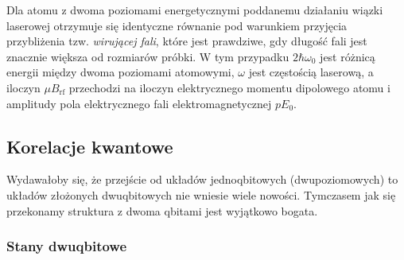 \documentclass{myclass}
\begin{document}
Dla atomu z dwoma poziomami energetycznymi poddanemu działaniu wiązki laserowej otrzymuje się
identyczne równanie pod warunkiem przyjęcia przybliżenia tzw. \textit{wirującej fali}, które jest
prawdziwe, gdy długość fali jest znacznie większa od rozmiarów próbki. W tym przypadku
\(2\hbar\omega_0\) jest różnicą energii między dwoma poziomami atomowymi, \(\omega\) jest częstością
laserową, a iloczyn \(\mu B_\text{rf}\) przechodzi na iloczyn elektrycznego momentu dipolowego atomu
i amplitudy pola elektrycznego fali elektromagnetycznej \(p E_0\).

\subsection{Korelacje kwantowe}

Wydawałoby się, że przejście od układów jednoqbitowych (dwupoziomowych) to układów złożonych
dwuqbitowych nie wniesie wiele nowości. Tymczasem jak się przekonamy struktura z dwoma qbitami jest
wyjątkowo bogata.

\subsubsection{Stany dwuqbitowe}
\end{document}
